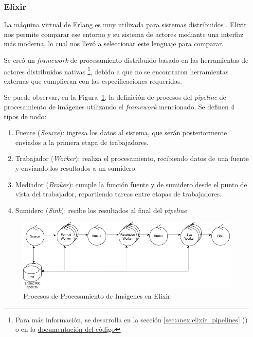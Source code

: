\documentclass[11pt]{article}
\let\Oldsubsubsection\subsubsection
\renewcommand{\subsubsection}{\FloatBarrier\Oldsubsubsection}
\newcommand{\english}[1]{\textit{#1}}
\begin{document}
\subsubsection{Elixir}

La máquina virtual de Erlang es muy utilizada para sistemas distribuidos \cite{elx:ex:companies} \cite{scala:lib:rabbit}. Elixir nos permite comparar ese entorno y su sistema de actores mediante una interfaz más moderna, lo cual nos llevó a seleccionar este lenguaje para comparar.

Se creó un \english{framework} de procesamiento distribuido basado en las herramientas de actores distribuidos nativas \footnote{Para más información, se desarrolla en la sección \ref{sec:anex:elixir_pipelines} () o en la \href{https://github.com/tpf-concurrent-benchmarks/image_processing_elixir/blob/main/distributed_pipeline/lib/nodes/README.md}{documentación del código}}, debido a que no se encontraron herramientas externas que cumplieran con las especificaciones requeridas.

Se puede observar, en la Figura~\ref{fig:elx:image_processing_framework}, la definición de procesos del \english{pipeline} de procesamiento de imágenes utilizando el \english{framework} mencionado. Se definen 4 tipos de nodo:
\begin{enumerate}
\item Fuente (\english{Source}): ingresa los datos al sistema, que serán posteriormente enviados a la primera etapa de trabajadores.
    \item Trabajador (\english{Worker}): realiza el procesamiento, recibiendo datos de una fuente y enviando los resultados a un sumidero.
    \item Mediador (\english{Broker}): cumple la función fuente y de sumidero desde el punto de vista del trabajador, repartiendo tareas entre etapas de trabajadores.
    \item  Sumidero (\english{Sink}): recibe los resultados al final del \english{pipeline}
\end{enumerate}

\begin{figure}[ht]
    \centering
    \includegraphics[scale=0.4]{resources/distributed_systems/elixir/image_processing_framework.png}
    \caption{Procesos de Procesamiento de Imágenes en Elixir}
    \label{fig:elx:image_processing_framework}
\end{figure}
\end{document}
